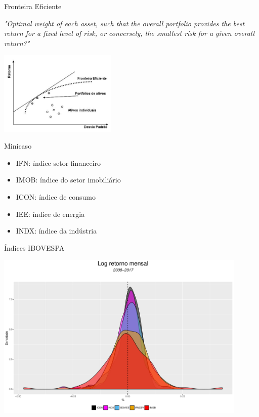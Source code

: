 \documentclass{beamer}
\begin{document}
\begin{frame}{Fronteira Eficiente}


\textit{"Optimal weight of each asset, such that the overall portfolio provides the best return for a fixed level of risk, or conversely, the smallest risk for a given overall
return?"} \cite{Laloux1999}



\begin{center}
 \includegraphics[height=4cm,keepaspectratio]{marko_02.png}
 \end{center}
 
\end{frame}


\begin{frame}{Minicaso}

\begin{itemize}
  \item IFN:  índice setor financeiro
  \item IMOB: índice do setor imobiliário
  \item ICON: índice de consumo
  \item IEE:  índice de energia
  \item INDX: índice da indústria
\end{itemize}

\end{frame}

\begin{frame}{Índices  IBOVESPA}

\begin{center}
 \includegraphics[height=8cm,keepaspectratio]{decritiva_indices.pdf}
 \end{center}


\end{frame}
\end{document}
